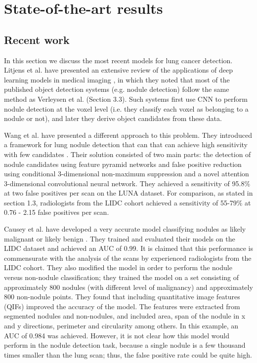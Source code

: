 \documentclass[12pt]{article}
\begin{document}
\section{State-of-the-art results}
\subsection{Recent work}
In this section we discuss the most recent models for lung cancer detection. Litjens et al. have presented an extensive review of the applications of deep learning models in medical imaging \citep{litjens2017survey}, in which they noted that most of the published object detection systems (e.g. nodule detection) follow the same method as Verleysen et al. (Section 3.3). Such systems first use CNN to perform nodule detection at the voxel level (i.e. they classify each voxel as belonging to a nodule or not), and later they derive object candidates from these data.

Wang et al. have presented a different approach to this problem. They introduced a framework for lung nodule detection that can that can achieve high sensitivity with few candidates \citep{wang2018automated}. Their solution consisted of two main parts: the detection of nodule candidates using feature pyramid networks and false positive reduction using conditional 3-dimensional non-maximum suppression and a novel attention 3-dimensional convolutional neural network. They achieved a sensitivity of 95.8\% at two false positives per scan on the LUNA dataset. For comparison, as stated in section 1.3, radiologists from the LIDC cohort achieved a sensitivity of 55-79$\%$ at 0.76 - 2.15 false positives per scan.


Causey et al. have developed a very accurate model classifying nodules as likely malignant or likely benign \citep{causey2018highly}. They trained and evaluated their models on the LIDC dataset and achieved an AUC of 0.99. It is claimed that this performance is commensurate with the analysis of the scans by experienced radiologists from the LIDC cohort. They also modified the model in order to perform the nodule versus non-nodule classification; they trained the model on a set consisting of approximately 800 nodules (with different level of malignancy) and approximately 800 non-nodule points. They found that including quantitative image features (QIFs) improved the accuracy of the model. The features were extracted from segmented nodules and non-nodules, and included area, span of the nodule in x and y directions, perimeter and circularity among others. In this example, an AUC of 0.984 was achieved. However, it is not clear how this model would perform in the nodule detection task, because a single nodule is a few thousand times smaller than the lung scan; thus, the false positive rate could be quite high. 
\end{document}
